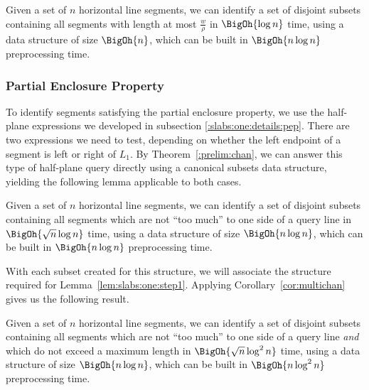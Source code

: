 \begin{lemma}
\label{lem:slabs:one:step1}
Given a set of $n$ horizontal line segments, we can identify a set of disjoint subsets containing all segments with length at most $\frac{w}{\rho}$ in $\BigOh{\log{n}}$ time, using a data structure of size $\BigOh{n}$, which can be built in $\BigOh{n \log{n}}$ preprocessing time.
\end{lemma}


\subsubsection{Partial Enclosure Property}

To identify segments satisfying the partial enclosure property, we use the half-plane expressions we developed in subsection \ref{:slabs:one:details:pep}.
There are two expressions we need to test, depending on whether the left endpoint of a segment is left or right of $L_1$.
By Theorem~\ref{:prelim:chan}, we can answer this type of half-plane query directly using a canonical subsets data structure, yielding the following lemma applicable to both cases.

\begin{lemma}
\label{lem:slabs:one:step2a}
Given a set of $n$ horizontal line segments, we can identify a set of disjoint subsets containing all segments which are not ``too much'' to one side of a query line in $\BigOh{\sqrt{n}\log{n}}$ time, using a data structure of size $\BigOh{n\log{n}}$, which can be built in $\BigOh{n\log{n}}$ preprocessing time.
\end{lemma}

With each subset created for this structure, we will associate the structure required for Lemma~\ref{lem:slabs:one:step1}.
Applying Corollary~\ref{cor:multichan} gives us the following result.

\begin{lemma}
\label{lem:slabs:one:step2b}
Given a set of $n$ horizontal line segments, we can identify a set of disjoint subsets containing all segments which are not ``too much'' to one side of a query line \emph{and} which do not exceed a maximum length in $\BigOh{\sqrt{n}\log^2{n}}$ time, using a data structure of size $\BigOh{n\log{n}}$, which can be built in $\BigOh{n\log^2{n}}$ preprocessing time.
\end{lemma}


